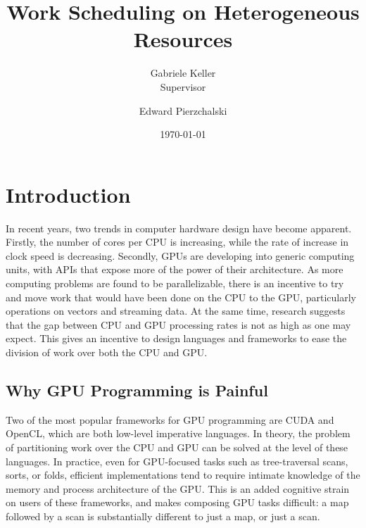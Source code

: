 \documentclass[a4paper,12pt]{article}
\title{Work Scheduling on Heterogeneous Resources}
\date{\today}
\author{Gabriele Keller\\\small{Supervisor} \and Edward Pierzchalski}
\begin{document}
\begin{titlepage}

\cleardoublepage
\maketitle
\thispagestyle{empty}

\end{titlepage}

\tableofcontents

\pagebreak

\section{Introduction}
In recent years, two trends in computer hardware design have become apparent.
Firstly, the number of cores per CPU is increasing, while the rate of increase in clock speed is decreasing.
Secondly, GPUs are developing into generic computing units, with APIs that expose more of the power of their architecture.
As more computing problems are found to be parallelizable, there is an incentive to try and move work that would have been done on the CPU to the GPU, particularly operations on vectors and streaming data.
At the same time, research suggests that the gap between CPU and GPU processing rates is not as high as one may expect. \citep{lee_debunking_2010, gregg_where_2011}
This gives an incentive to design languages and frameworks to ease the division of work over both the CPU and GPU.

\subsection{Why GPU Programming is Painful}
Two of the most popular frameworks for GPU programming are CUDA and OpenCL, which are both low-level imperative languages. 
In theory, the problem of partitioning work over the CPU and GPU can be solved at the level of these languages. 
In practice, even for GPU-focused tasks such as tree-traversal scans, sorts, or folds, efficient implementations tend to require intimate knowledge of the memory and process architecture of the GPU. \citet{harris_parallel_2007, satish_designing_2008}
This is an added cognitive strain on users of these frameworks, and makes composing GPU tasks difficult: a map followed by a scan is substantially different to just a map, or just a scan.
\end{document}
